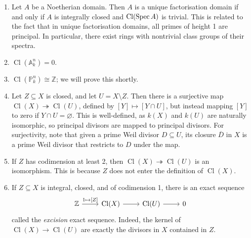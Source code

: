 \begin{remark}
    \begin{enumerate}
        \item Let \( A \) be a Noetherian domain.
        Then \( A \) is a unique factorisation domain if and only if \( A \) is integrally closed and \( \operatorname{Cl}(\operatorname{Spec} A) \) is trivial.
        This is related to the fact that in unique factorisation domains, all primes of height 1 are principal.
        In particular, there exist rings with nontrivial class groups of their spectra.
        \item \( \operatorname{Cl}(\mathbb A^n_k) = 0 \).
        \item \( \operatorname{Cl}(\mathbb P^n_k) \cong \mathbb Z \); we will prove this shortly.
        \item Let \( Z \subseteq X \) is closed, and let \( U = X \setminus Z \).
        Then there is a surjective map \( \operatorname{Cl}(X) \twoheadrightarrow \operatorname{Cl}(U) \), defined by \( [Y] \mapsto [Y \cap U] \), but instead mapping \( [Y] \) to zero if \( Y \cap U = \varnothing \).
        This is well-defined, as \( k(X) \) and \( k(U) \) are naturally isomorphic, so principal divisors are mapped to principal divisors.
        For surjectivity, note that given a prime Weil divisor \( D \subseteq U \), its closure \( \overline D \) in \( X \) is a prime Weil divisor that restricts to \( D \) under the map.
        \item If \( Z \) has codimension at least 2, then \( \operatorname{Cl}(X) \twoheadrightarrow \operatorname{Cl}(U) \) is an isomorphism.
        This is because \( Z \) does not enter the definition of \( \operatorname{Cl}(X) \).
        \item If \( Z \subseteq X \) is integral, closed, and of codimension 1, there is an exact sequence
        \[\begin{tikzcd}
            {\mathbb Z} & {\operatorname{Cl}(X)} & {\operatorname{Cl}(U)} & 0
            \arrow["{1 \mapsto [Z]}", from=1-1, to=1-2]
            \arrow[from=1-2, to=1-3]
            \arrow[from=1-3, to=1-4]
        \end{tikzcd}\]
        called the \emph{excision} exact sequence.
        Indeed, the kernel of \( \operatorname{Cl}(X) \to \operatorname{Cl}(U) \) are exactly the divisors in \( X \) contained in \( Z \).
    \end{enumerate}
\end{remark}

